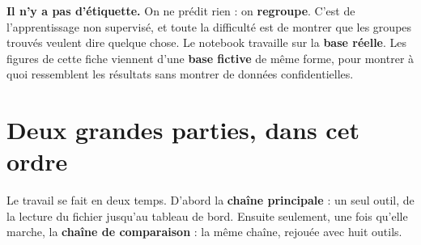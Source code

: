 \begin{piege}
\textbf{Il n'y a pas d'étiquette.} On ne prédit rien : on \textbf{regroupe}. C'est de l'apprentissage
non supervisé, et toute la difficulté est de montrer que les groupes trouvés veulent dire quelque chose.
Le notebook travaille sur la \textbf{base réelle}. Les figures de cette fiche viennent d'une
\textbf{base fictive} de même forme, pour montrer à quoi ressemblent les résultats sans montrer de données
confidentielles.
\end{piege}

\newpage
\section{Deux grandes parties, dans cet ordre}

Le travail se fait en deux temps. D'abord la \textbf{chaîne principale} : un seul outil, de la lecture
du fichier jusqu'au tableau de bord. Ensuite seulement, une fois qu'elle marche, la \textbf{chaîne de
comparaison} : la même chaîne, rejouée avec huit outils.

